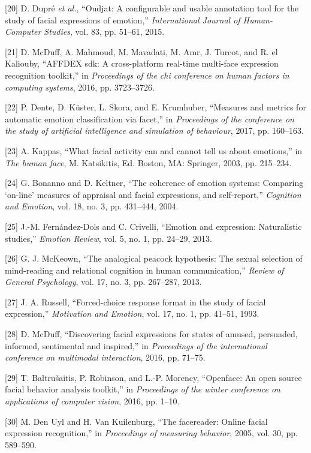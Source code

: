 \documentclass[conference,final,]{IEEEtran}
\begin{document}
\leavevmode\hypertarget{ref-dupre2015oudjat}{}%
{[}20{]} D. Dupré \emph{et al.}, ``Oudjat: A configurable and usable
annotation tool for the study of facial expressions of emotion,''
\emph{International Journal of Human-Computer Studies}, vol. 83, pp.
51--61, 2015.

\leavevmode\hypertarget{ref-mcduff2016affdex}{}%
{[}21{]} D. McDuff, A. Mahmoud, M. Mavadati, M. Amr, J. Turcot, and R.
el Kaliouby, ``AFFDEX sdk: A cross-platform real-time multi-face
expression recognition toolkit,'' in \emph{Proceedings of the chi
conference on human factors in computing systems}, 2016, pp. 3723--3726.

\leavevmode\hypertarget{ref-dente2017measures}{}%
{[}22{]} P. Dente, D. Küster, L. Skora, and E. Krumhuber, ``Measures and
metrics for automatic emotion classification via facet,'' in
\emph{Proceedings of the conference on the study of artificial
intelligence and simulation of behaviour}, 2017, pp. 160--163.

\leavevmode\hypertarget{ref-kappas2003facial}{}%
{[}23{]} A. Kappas, ``What facial activity can and cannot tell us about
emotions,'' in \emph{The human face}, M. Katsikitis, Ed. Boston, MA:
Springer, 2003, pp. 215--234.

\leavevmode\hypertarget{ref-bonanno2004brief}{}%
{[}24{]} G. Bonanno and D. Keltner, ``The coherence of emotion systems:
Comparing `on-line' measures of appraisal and facial expressions, and
self-report,'' \emph{Cognition and Emotion}, vol. 18, no. 3, pp.
431--444, 2004.

\leavevmode\hypertarget{ref-fernandez2013emotion}{}%
{[}25{]} J.-M. Fernández-Dols and C. Crivelli, ``Emotion and expression:
Naturalistic studies,'' \emph{Emotion Review}, vol. 5, no. 1, pp.
24--29, 2013.

\leavevmode\hypertarget{ref-mckeown2013analogical}{}%
{[}26{]} G. J. McKeown, ``The analogical peacock hypothesis: The sexual
selection of mind-reading and relational cognition in human
communication,'' \emph{Review of General Psychology}, vol. 17, no. 3,
pp. 267--287, 2013.

\leavevmode\hypertarget{ref-russell1993forced}{}%
{[}27{]} J. A. Russell, ``Forced-choice response format in the study of
facial expression,'' \emph{Motivation and Emotion}, vol. 17, no. 1, pp.
41--51, 1993.

\leavevmode\hypertarget{ref-mcduff2016discovering}{}%
{[}28{]} D. McDuff, ``Discovering facial expressions for states of
amused, persuaded, informed, sentimental and inspired,'' in
\emph{Proceedings of the international conference on multimodal
interaction}, 2016, pp. 71--75.

\leavevmode\hypertarget{ref-baltruvsaitis2016openface}{}%
{[}29{]} T. Baltrušaitis, P. Robinson, and L.-P. Morency, ``Openface: An
open source facial behavior analysis toolkit,'' in \emph{Proceedings of
the winter conference on applications of computer vision}, 2016, pp.
1--10.

\leavevmode\hypertarget{ref-den2005facereader}{}%
{[}30{]} M. Den Uyl and H. Van Kuilenburg, ``The facereader: Online
facial expression recognition,'' in \emph{Proceedings of measuring
behavior}, 2005, vol. 30, pp. 589--590.
\end{document}
